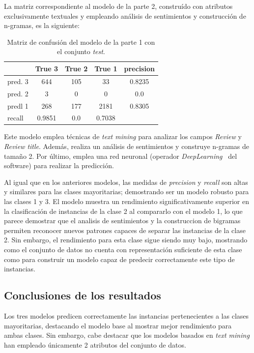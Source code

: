 \documentclass[es]{uc3mreport}
\begin{document}
\begin{report}
La matriz correspondiente al modelo de la parte 2, construído con atributos
exclusivamente textuales y empleando análisis de sentimientos y construcción de
n-gramas, es la siguiente:

\begin{table}[H]
\center
\begin{tabular}{@{}lccc|c@{}}
    \toprule
             & True 3 & True 2 & True 1 & precision\\
    \hline
    pred. 3  & 644 & 105       & 33     & 0.8235   \\
    pred. 2  & 3   & 0         & 0      & 0.0      \\
    predl 1  & 268 & 177       & 2181   & 0.8305   \\
    \hline
    recall   & 0.9851 & 0.0 & 0.7038 &          \\
    \bottomrule
\end{tabular}
\caption{Matriz de confusión del modelo de la parte 1 con el conjunto \textit{test}.}
\end{table}

Este modelo emplea técnicas de \textit{text mining} para analizar los campos
\textit{Review} y \textit{Review title}. Además, realiza un análisis de
sentimientos y construye n-gramas de tamaño 2. Por último, emplea una red neuronal (operador
\textit{DeepLearning}~\cite{deeplearning} del software) para realizar la
predicción.

Al igual que en los anteriores modelos, las medidas de \textit{precision} y
\textit{recall} son altas y similares para las clases mayoritarias; demostrando
ser un modelo robusto para las clases 1 y 3. El modelo muestra un
rendimiento significativamente superior en la clasificación de instancias de la clase
2 al compararlo con el modelo 1, lo que parece demostrar que el analisis de
sentimientos y la construccion de bigramas permiten reconocer nuevos patrones
capaces de separar las instancias de la clase 2. Sin embargo, el rendimiento
para esta clase sigue siendo muy bajo, mostrando como el conjunto de datos no
cuenta con representación suficiente de esta clase como para construir un modelo capaz de
predecir correctamente este tipo de instancias.

\subsection{Conclusiones de los resultados}
\label{subsec:comparar_conclusiones}

Los tres modelos predicen correctamente las instancias pertenecientes a las
clases mayoritarias, destacando el modelo base al mostrar mejor rendimiento para
ambas clases. Sin embargo, cabe destacar que los modelos basados en
\textit{text mining} han empleado únicamente 2 atributos del conjunto de datos.


\end{report}
\end{document}
